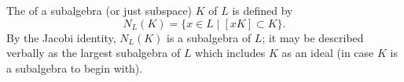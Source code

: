 The  of a subalgebra (or just subspace) $K$ of $L$ is defined by
$$N_L(K) = \{x \in L \mid [xK] \subset K\}.$$
By the Jacobi identity, $N_L(K)$ is a subalgebra of $L$; it may be described verbally as the largest subalgebra of $L$ which includes $K$ as an ideal (in case $K$ is a subalgebra to begin with).
